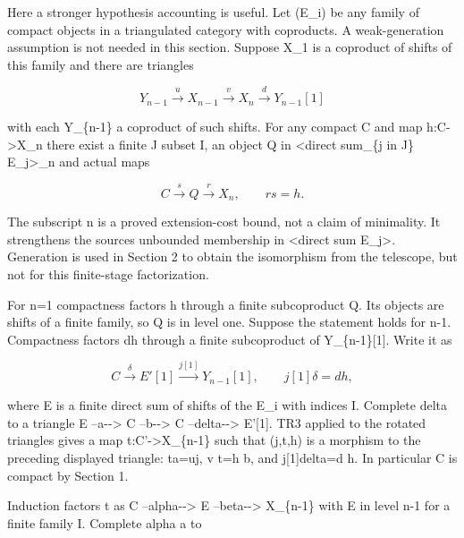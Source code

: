 \documentclass[11pt]{article}
\begin{document}
Here a stronger hypothesis accounting is useful. Let (E\_\allowbreak{}i)\allowbreak{} be any family of compact objects in a triangulated category with coproducts. A weak-generation assumption is not needed in this section. Suppose X\_\allowbreak{}1 is a coproduct of shifts of this family and there are triangles

\[
 Y_{n-1}\xrightarrow u X_{n-1}\xrightarrow v X_n
        \xrightarrow d Y_{n-1}[1]
\]

with each Y\_\allowbreak{}\{n-1\} a coproduct of such shifts. For any compact C and map h:\allowbreak{}C\allowbreak{}->X\_\allowbreak{}n there exist a finite J subset I,\allowbreak{} an object Q in \textless direct sum\_\allowbreak{}\{j in J\} E\_\allowbreak{}j>\_\allowbreak{}n and actual maps

\[
 C\xrightarrow s Q\xrightarrow r X_n,\qquad rs=h.
\]

The subscript n is a proved extension-cost bound,\allowbreak{} not a claim of minimality. It strengthens the source\textquotesingle s unbounded membership in \textless direct sum E\_\allowbreak{}j>. Generation is used in Section 2 to obtain the isomorphism from the telescope,\allowbreak{} but not for this finite-stage factorization.

For n\allowbreak{}=1 compactness factors h through a finite subcoproduct Q. Its objects are shifts of a finite family,\allowbreak{} so Q is in level one. Suppose the statement holds for n-1. Compactness factors dh through a finite subcoproduct of Y\_\allowbreak{}\{n-1\}[1]\allowbreak{}. Write it as

\[
 C\xrightarrow\delta E'[1]\xrightarrow{j[1]}Y_{n-1}[1],
 \qquad j[1]\delta=dh,
\]

where E\textquotesingle{} is a finite direct sum of shifts of the E\_\allowbreak{}i with indices I\textquotesingle. Complete delta to a triangle E\textquotesingle{} --a-\allowbreak{}-> C\textquotesingle{} --b-\allowbreak{}-> C --delta-\allowbreak{}-> E'[1]\allowbreak{}. TR3 applied to the rotated triangles gives a map t:\allowbreak{}C'\allowbreak{}->X\_\allowbreak{}\{n-1\} such that (j,\allowbreak{}t,\allowbreak{}h)\allowbreak{} is a morphism to the preceding displayed triangle:\allowbreak{} ta\allowbreak{}=uj,\allowbreak{} v t\allowbreak{}=h b,\allowbreak{} and j[1]\allowbreak{}delta\allowbreak{}=d h. In particular C\textquotesingle{} is compact by Section 1.

Induction factors t as C\textquotesingle{} --alpha-\allowbreak{}-> E\textquotesingle\textquotesingle{} --beta-\allowbreak{}-> X\_\allowbreak{}\{n-1\} with E\textquotesingle\textquotesingle{} in level n-1 for a finite family I\textquotesingle\textquotesingle. Complete alpha a to
\end{document}
